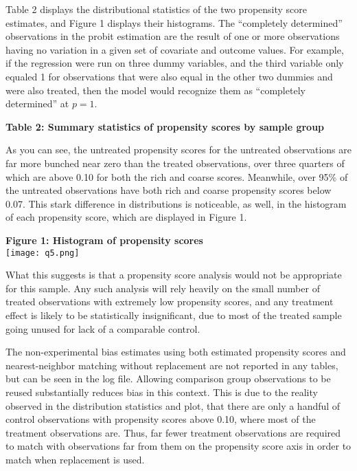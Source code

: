 \documentclass{article}
\begin{document}
\noindent Table 2 displays the distributional statistics of the two propensity score estimates, and Figure 1 displays their histograms. The ``completely determined'' observations in the probit estimation are the result of one or more observations having no variation in a given set of covariate and outcome values. For example, if the regression were run on three dummy variables, and the third variable only equaled 1 for observations that were also equal in the other two dummies and were also treated, then the model would recognize them as ``completely determined'' at $p=1$.
\begin{center}
        \textbf{Table 2: Summary statistics of propensity scores by sample group} \\
        
\end{center}
\noindent As you can see, the untreated propensity scores for the untreated observations are far more bunched near zero than the treated observations, over three quarters of which are above 0.10 for both the rich and coarse scores. Meanwhile, over 95\% of the untreated observations have both rich and coarse propensity scores below 0.07. This stark difference in distributions is noticeable, as well, in the histogram of each propensity score, which are displayed in Figure 1.
\begin{center}
        \textbf{Figure 1: Histogram of propensity scores} \\
        \texttt{[image: q5.png]}
\end{center}
\noindent What this suggests is that a propensity score analysis would not be appropriate for this sample. Any such analysis will rely heavily on the small number of treated observations with extremely low propensity scores, and any treatment effect is likely to be statistically insignificant, due to most of the treated sample going unused for lack of a comparable control.

The non-experimental bias estimates using both estimated propensity scores and nearest-neighbor matching without replacement are not reported in any tables, but can be seen in the log file.  Allowing comparison group observations to be reused substantially reduces bias in this context. This is due to the reality observed in the distribution statistics and plot, that there are only a handful of control observations with propensity scores above 0.10, where most of the treatment observations are. Thus, far fewer treatment observations are required to match with observations far from them on the propensity score axis in order to match when replacement is used.
\end{document}
